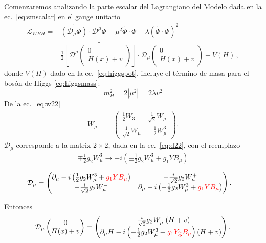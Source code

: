 \begin{frame}
Comenzaremos analizando la parte escalar del Lagrangiano del Modelo dada en la ec.~\eqref{eq:smscalar} en el gauge unitario
\begin{align}
  \mathcal{L}_{WBH}
  =&\widetilde{\left( \mathcal{D}_\mu{\Phi} \right)}\cdot\mathcal{D}^\mu\Phi-\mu^2\widetilde{\Phi}\cdot\Phi-\lambda \left( \widetilde{\Phi}\cdot\Phi \right)^2 \nonumber\\
  =&\frac{1}{2}\widetilde{\left[\mathcal{D}^\mu \begin{pmatrix}
    0\\
    H(x)+v
  \end{pmatrix}\right]}\cdot \mathcal{D}_\mu\begin{pmatrix}
    0\\
    H(x)+v
  \end{pmatrix}-V(H)\,,
\end{align}
donde $V(H)$ dado en la ec.~\eqref{eq:higgspot}, incluye el término de masa para el bosón de Higgs \eqref{eq:higgsmass}:
\begin{equation}
  m_H^2=2\left|\mu^2\right|=2\lambda v^2
\end{equation}
De la ec.~\eqref{eq:w22}
\begin{align}
      W_\mu=&\begin{pmatrix}
    \frac{1}{2}W_3&\frac{1}{\sqrt{2}}W^+_\mu\\
    \frac{1}{\sqrt{2}}W^-_\mu&-\frac{1}{2}W^3_\mu
  \end{pmatrix}.
\end{align}
$\mathcal{D}_\mu$ corresponde a la matrix $2\times  2$, dada en la ec.~\eqref{eq:d22}, con el reemplazo
\begin{align}
\mp\frac{i}{2}g_2 W^3_\mu\to  -i\left(\pm\frac{1}{2}g_2 W^3_\mu+{g_1}Y B_\mu\right)
\end{align}

\begin{align}
  \label{eq:dercovsu2L}
 \mathcal{D}_\mu &=  \begin{pmatrix}
    \partial_\mu-i\left(\frac{1}{2}g_2 W^3_\mu+{\color{red}{g_1} Y B_\mu}\right)&-\frac{i}{\sqrt{2}}g_2 W^+_\mu\\
    -\frac{i}{\sqrt{2}}g_2 W^-_\mu&\partial_\mu-i\left(-\frac{1}{2}g_2 W^3_\mu+{\color{red}{g_1}Y B_\mu}\right)
  \end{pmatrix}.
\end{align}

Entonces
\begin{align}
\mathcal{D}_\mu \begin{pmatrix}
    0\\
    H(x)+v
  \end{pmatrix}=\begin{pmatrix}
    -\frac{i}{\sqrt{2}}g_2 W_\mu^+(H+v)\\
    \partial_\mu H-i\left(-\frac{1}{2}g_2 W^3_\mu+{\color{red}{g_1}Y_{\widetilde{\Phi}} B_\mu}\right)(H+v)
  \end{pmatrix}.
\end{align}


\end{frame}

